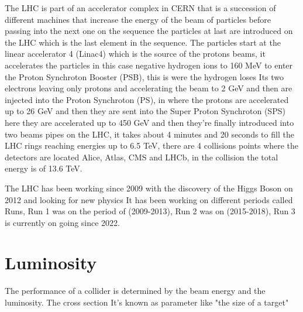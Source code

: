 The LHC is part of an accelerator complex in CERN that is a succession of different machines that increase the energy of the beam of particles before passing into the next one on the sequence the particles at last are introduced on the LHC which is the last element in the sequence. The particles start at the linear accelerator 4 (Linac4) which is the source of the protons beams, it accelerates the particles in this case negative hydrogen ions to 160 MeV to enter the Proton Synchroton Booster (PSB), this is were the hydrogen loses Its two electrons leaving only protons and accelerating the beam to 2 GeV  and then are injected into the Proton Synchroton (PS), in where the protons are accelerated up to 26 GeV and then they are sent into the Super Proton Synchroton (SPS) here they are accelerated up to 450 GeV and then they're finally introduced into two beams pipes on the LHC, it takes about 4 minutes and 20 seconds to fill the LHC rings reaching energies up to 6.5 TeV, there are 4 collisions points where the detectors are located Alice, Atlas, CMS and LHCb, in the collision the total energy is of 13.6 TeV. \cite{LHCII}

The LHC has been working since 2009 with the discovery of the Higgs Boson on 2012 and looking for new physics It has been working on different periods called Runs, Run 1 was on the period of (2009-2013), Run 2 was on (2015-2018), Run 3 is currently on going since 2022. 

\section{Luminosity}


The performance of a collider is determined by the beam energy and the luminosity. The cross section It's known as parameter like "the size of a target" 


